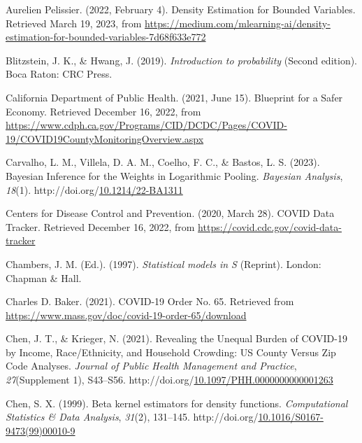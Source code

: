 \documentclass[12pt,twoside]{smiththesis}
\newlength{\cslhangindent}
\newenvironment{CSLReferences}[2] %
 {%
\setlength{\parindent}{0pt}
\ifodd #1 \everypar{\setlength{\hangindent}{\cslhangindent}}\ignorespaces\fi
\ifnum #2 > 0
\setlength{\parskip}{#2\baselineskip}
  \fi
}%
{}
\begin{document}
\hypertarget{refs}{}
\begin{CSLReferences}{1}{0}
\leavevmode{}%
Aurelien Pelissier. (2022, February 4). Density Estimation for Bounded Variables. Retrieved March 19, 2023, from \url{https://medium.com/mlearning-ai/density-estimation-for-bounded-variables-7d68f633e772}

\leavevmode{}%
Blitzstein, J. K., \& Hwang, J. (2019). \emph{Introduction to probability} (Second edition). Boca Raton: CRC Press.

\leavevmode{}%
California Department of Public Health. (2021, June 15). Blueprint for a Safer Economy. Retrieved December 16, 2022, from \url{https://www.cdph.ca.gov/Programs/CID/DCDC/Pages/COVID-19/COVID19CountyMonitoringOverview.aspx}

\leavevmode{}%
Carvalho, L. M., Villela, D. A. M., Coelho, F. C., \& Bastos, L. S. (2023). Bayesian Inference for the Weights in Logarithmic Pooling. \emph{Bayesian Analysis}, \emph{18}(1). http://doi.org/\href{https://doi.org/10.1214/22-BA1311}{10.1214/22-BA1311}

\leavevmode{}%
Centers for Disease Control and Prevention. (2020, March 28). COVID Data Tracker. Retrieved December 16, 2022, from \url{https://covid.cdc.gov/covid-data-tracker}

\leavevmode{}%
Chambers, J. M. (Ed.). (1997). \emph{Statistical models in S} (Reprint). London: Chapman \& Hall.

\leavevmode{}%
Charles D. Baker. (2021). COVID-19 Order No. 65. Retrieved from \url{https://www.mass.gov/doc/covid-19-order-65/download}

\leavevmode{}%
Chen, J. T., \& Krieger, N. (2021). Revealing the Unequal Burden of COVID-19 by Income, Race/Ethnicity, and Household Crowding: US County Versus Zip Code Analyses. \emph{Journal of Public Health Management and Practice}, \emph{27}(Supplement 1), S43--S56. http://doi.org/\href{https://doi.org/10.1097/PHH.0000000000001263}{10.1097/PHH.0000000000001263}

\leavevmode{}%
Chen, S. X. (1999). Beta kernel estimators for density functions. \emph{Computational Statistics \& Data Analysis}, \emph{31}(2), 131--145. http://doi.org/\href{https://doi.org/10.1016/S0167-9473(99)00010-9}{10.1016/S0167-9473(99)00010-9}


\end{CSLReferences}
\end{document}
